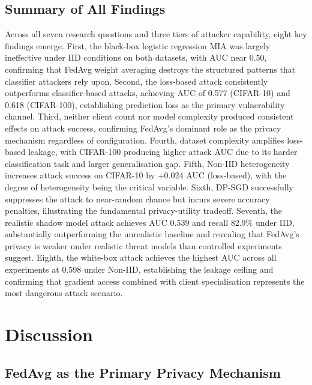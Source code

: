 \documentclass[12pt, a4paper]{report}
\begin{document}
\section{Summary of All Findings}

Across all seven research questions and three tiers of attacker capability, eight
key findings emerge. First, the black-box logistic regression MIA was largely
ineffective under IID conditions on both datasets, with AUC near 0.50, confirming
that FedAvg weight averaging destroys the structured patterns that classifier
attackers rely upon. Second, the loss-based attack consistently outperforms
classifier-based attacks, achieving AUC of 0.577 (CIFAR-10) and 0.618
(CIFAR-100), establishing prediction loss as the primary vulnerability channel.
Third, neither client count nor model complexity produced consistent effects on
attack success, confirming FedAvg's dominant role as the privacy mechanism
regardless of configuration. Fourth, dataset complexity amplifies loss-based
leakage, with CIFAR-100 producing higher attack AUC due to its harder
classification task and larger generalisation gap. Fifth, Non-IID heterogeneity
increases attack success on CIFAR-10 by +0.024 AUC (loss-based), with the degree
of heterogeneity being the critical variable. Sixth, DP-SGD successfully suppresses
the attack to near-random chance but incurs severe accuracy penalties, illustrating
the fundamental privacy-utility tradeoff. Seventh, the realistic shadow model
attack achieves AUC 0.539 and recall 82.9\% under IID, substantially outperforming
the unrealistic baseline and revealing that FedAvg's privacy is weaker under
realistic threat models than controlled experiments suggest. Eighth, the white-box
attack achieves the highest AUC across all experiments at 0.598 under Non-IID,
establishing the leakage ceiling and confirming that gradient access combined with
client specialisation represents the most dangerous attack scenario.

\chapter{Discussion}

\section{FedAvg as the Primary Privacy Mechanism}
\end{document}
